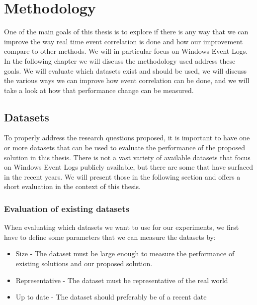\chapter{Methodology}
\label{chap:methodology}

One of the main goals of this thesis is to explore if there is any way that we can improve the way real time event correlation is done and how our improvement compare to other methods. We will in particular focus on  Windows Event Logs. In the following chapter we will discuss the methodology used address these goals. We will evaluate which datasets exist and should be used, we will discuss the various ways we can improve how event correlation can be done, and we will take a look at how that performance change can be measured.

\section{Datasets}
\label{sec:datasets}
To properly address the research questions proposed, it is important to have one or more datasets that can be used to evaluate the performance of the proposed solution in this thesis.
There is not a vast variety of available datasets that focus on Windows Event Logs publicly available, but there are some that have surfaced in the recent years. We will present those in the following section and offers a short evaluation in the context of this thesis.

\subsection{Evaluation of existing datasets}
\label{sub:evaluation-of-existing-datasets}
When evaluating which datasets we want to use for our experiments, we first have to define some parameters that we can measure the datasets by:
\begin{itemize}
    \item Size - The dataset must be large enough to measure the performance of existing solutions and our proposed solution.
    \item Representative - The dataset must be representative of the real world
    \item Up to date - The dataset should preferably be of a recent date
\end{itemize}

